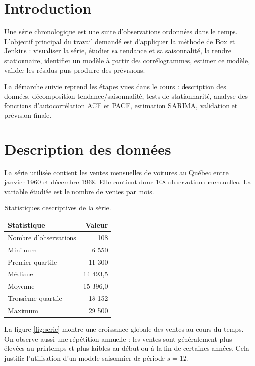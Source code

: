 \documentclass[12pt,a4paper]{article}
\begin{document}
\section{Introduction}

Une série chronologique est une suite d'observations ordonnées dans le temps.
L'objectif principal du travail demandé est d'appliquer la méthode de Box et Jenkins :
visualiser la série, étudier sa tendance et sa saisonnalité, la rendre stationnaire,
identifier un modèle à partir des corrélogrammes, estimer ce modèle, valider les
résidus puis produire des prévisions.

La démarche suivie reprend les étapes vues dans le cours : description des données,
décomposition tendance/saisonnalité, tests de stationnarité, analyse des fonctions
d'autocorrélation ACF et PACF, estimation SARIMA, validation et prévision finale.

\section{Description des données}

La série utilisée contient les ventes mensuelles de voitures au Québec entre janvier
1960 et décembre 1968. Elle contient donc 108 observations mensuelles. La variable
étudiée est le nombre de ventes par mois.

\begin{table}[H]
\centering
\begin{tabular}{lr}
\toprule
Statistique & Valeur \\
\midrule
Nombre d'observations & 108 \\
Minimum & 6 550 \\
Premier quartile & 11 300 \\
Médiane & 14 493,5 \\
Moyenne & 15 396,0 \\
Troisième quartile & 18 152 \\
Maximum & 29 500 \\
\bottomrule
\end{tabular}
\caption{Statistiques descriptives de la série.}
\end{table}

La figure \ref{fig:serie} montre une croissance globale des ventes au cours du temps.
On observe aussi une répétition annuelle : les ventes sont généralement plus élevées
au printemps et plus faibles au début ou à la fin de certaines années. Cela justifie
l'utilisation d'un modèle saisonnier de période $s=12$.
\end{document}
